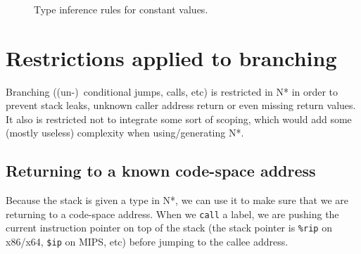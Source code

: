 \begin{figure}[htb]
  \centering

  \begin{prooftree}
  \end{prooftree}
  \\\vspace{\baselineskip}
  \begin{prooftree}
  \end{prooftree}
  \\\vspace{\baselineskip}
  \begin{prooftree}
  \end{prooftree}
  \\\vspace{\baselineskip}
  \begin{prooftree}
  \end{prooftree}

  \caption{Type inference rules for constant values.}
  \label{fig:nstar-common-constvalue-typerules}
\end{figure}

\section{Restrictions applied to branching}\label{sec:nstar-common-bs}

Branching ((un-)\ conditional jumps, calls, etc) is restricted in N* in order to prevent stack leaks, unknown caller address return or even missing return values.
It also is restricted not to integrate some sort of scoping, which would add some (mostly useless) complexity when using/generating N*.

\subsection{Returning to a known code-space address}\label{subsec:nstar-common-bs-ret}

Because the stack is given a type in N*, we can use it to make sure that we are returning to a code-space address.
When we \texttt{call} a label, we are pushing the current instruction pointer on top of the stack (the stack pointer is \texttt{\%rip} on x86/x64, \texttt{\$ip} on MIPS, etc) before jumping to the callee address.

